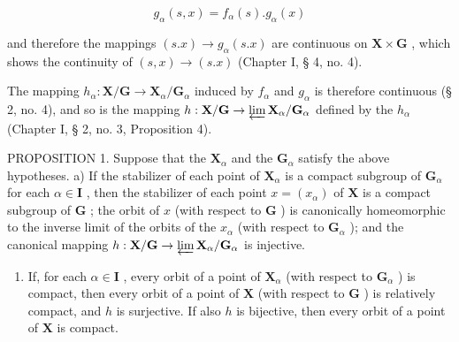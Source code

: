 \[
g _ {\alpha} (s, x) = f _ {\alpha} (s). g _ {\alpha} (x)
\]

and therefore the mappings \((s.x) \to g_{\alpha}(s.x)\) are continuous on \(\mathbf{X} \times \mathbf{G}\) , which shows the continuity of \((s, x) \to (s.x)\) (Chapter I, § 4, no. 4).

The mapping \(h_{\alpha}: \mathbf{X} / \mathbf{G} \to \mathbf{X}_{\alpha} / \mathbf{G}_{\alpha}\) induced by \(f_{\alpha}\) and \(g_{\alpha}\) is therefore continuous (§ 2, no. 4), and so is the mapping \(h: \mathbf{X} / \mathbf{G} \to \varprojlim \mathbf{X}_{\alpha} / \mathbf{G}_{\alpha}\) defined by the \(h_{\alpha}\) (Chapter I, § 2, no. 3, Proposition 4).

PROPOSITION 1. Suppose that the \(\mathbf{X}_{\alpha}\) and the \(\mathbf{G}_{\alpha}\) satisfy the above hypotheses. a) If the stabilizer of each point of \(\mathbf{X}_{\alpha}\) is a compact subgroup of \(\mathbf{G}_{\alpha}\) for each \(\alpha \in \mathbf{I}\) , then the stabilizer of each point \(x = (x_{\alpha})\) of \(\mathbf{X}\) is a compact subgroup of \(\mathbf{G}\) ; the orbit of \(x\) (with respect to \(\mathbf{G}\) ) is canonically homeomorphic to the inverse limit of the orbits of the \(x_{\alpha}\) (with respect to \(\mathbf{G}_{\alpha}\) ); and the canonical mapping \(h: \mathbf{X} / \mathbf{G} \to \varprojlim \mathbf{X}_{\alpha} / \mathbf{G}_{\alpha}\) is injective.

\begin{enumerate}
\def\labelenumi{\alph{enumi})}
\setcounter{enumi}{1}
\tightlist
\item
  If, for each \(\alpha \in \mathbf{I}\) , every orbit of a point of \(\mathbf{X}_{\alpha}\) (with respect to \(\mathbf{G}_{\alpha}\) ) is compact, then every orbit of a point of \(\mathbf{X}\) (with respect to \(\mathbf{G}\) ) is relatively compact, and \(h\) is surjective. If also \(h\) is bijective, then every orbit of a point of \(\mathbf{X}\) is compact.
\end{enumerate}

